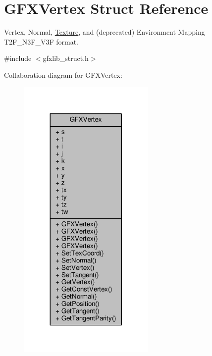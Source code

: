 \hypertarget{structGFXVertex}{}\section{G\+F\+X\+Vertex Struct Reference}
\label{structGFXVertex}


Vertex, Normal, \hyperlink{classTexture}{Texture}, and (deprecated) Environment Mapping T2\+F\+\_\+\+N3\+F\+\_\+\+V3F format.  




{\ttfamily \#include $<$gfxlib\+\_\+struct.\+h$>$}



Collaboration diagram for G\+F\+X\+Vertex\+:
\nopagebreak
\begin{figure}[H]
\begin{center}
\leavevmode
\includegraphics[width=188pt]{da/da3/structGFXVertex__coll__graph}
\end{center}
\end{figure}
